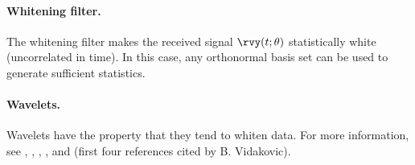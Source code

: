 \paragraph{Whitening filter.}
The whitening filter makes the received signal $\rvy(t;\theta)$ statistically white
(uncorrelated in time). In this case,
any orthonormal basis set can be used to generate sufficient statistics.

\paragraph{Wavelets.}
Wavelets have the property that they tend to whiten data.
For more information, see
,
,
,
, and
(first four references cited by B. Vidakovic).

